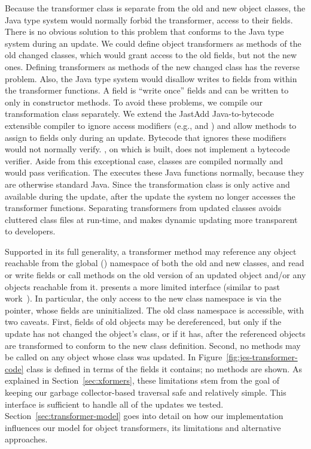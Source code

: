 Because the transformer class is separate from the old and new object
classes, the Java type system would normally forbid the transformer, access
to their \private fields. There is no obvious solution to this problem
that conforms to the Java type system during an update. We could define object transformers
as methods of the old changed classes, which would grant access to the old
fields, but not the new ones.  Defining transformers as methods of the new
changed class has the reverse problem. Also, the Java type system would
disallow writes to \final fields from within the transformer
functions. A \final field is ``write once'' fields and can be written
to only in constructor methods.  To avoid these problems, we compile our
transformation class separately.  We extend the JastAdd Java-to-bytecode
extensible compiler \cite{JastAddJ} to ignore access modifiers (e.g., \private
and \protectd) and allow methods to assign to \final
fields only during an update.  Bytecode that ignores these modifiers would not normally verify.
\RVM, on which \JV is built, does not implement a
bytecode verifier.  Aside from this exceptional case, \JV classes are
compiled normally and would pass verification. The \VM executes these
Java functions normally, because they are otherwise standard Java. Since
the transformation class is only active and available during the update,
after the update the system no longer accesses the transformer functions.
Separating transformers from
updated classes avoids cluttered class files at run-time, and makes dynamic
updating more transparent to developers.

Supported in its full generality, a transformer method may reference any
object reachable from the global (\static) namespace of both the old
and new classes, and read or write fields or call methods on the old
version of an updated object and/or any objects reachable from it. \JV
presents a more limited interface (similar to past
work~\cite{ritzau00dynamic,Mala00a}). In particular, the only access to the
new class namespace is via the \TO pointer, whose fields are
uninitialized. The old class namespace is accessible, with two caveats.
First, fields of old objects may be dereferenced, but only if the update
has not changed the object's class, or if it has, after the referenced
objects are transformed to conform to the new class definition. Second, no
methods may be called on any object whose class was updated. In
Figure~\ref{fig:jes-transformer-code} class \oUser is defined in terms of
the fields it contains; no methods are shown. As explained in
Section~\ref{sec:xformers}, these limitations stem from the goal of keeping
our garbage collector-based traversal safe and relatively simple. This
interface is sufficient to handle all of the updates we tested.
Section~\ref{sec:transformer-model} goes into detail on how our
implementation influences our model for object transformers, its
limitations and alternative approaches.

